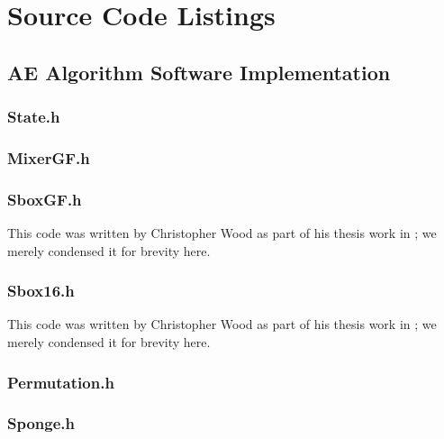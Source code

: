 \chapter{Source Code Listings}
\label{appx:SourceCodeListings}

\singlespace
\section{AE Algorithm Software Implementation}

\subsection{State.h}


\subsection{MixerGF.h}


\subsection{SboxGF.h}
This code was written by Christopher Wood as part of his thesis work in \cite{Wood2013_SboxThesis}; we merely condensed it for brevity here.


\subsection{Sbox16.h}
This code was written by Christopher Wood as part of his thesis work in \cite{Wood2013_SboxThesis}; we merely condensed it for brevity here.


\subsection{Permutation.h}
\label{sec:Permutation.h}


\subsection{Sponge.h}


